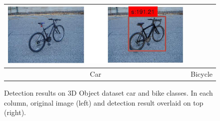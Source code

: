 \documentclass[10pt,twocolumn,letterpaper]{article}
\begin{document}
\begin{figure}[h]
\begin{tabular}{|c|c|}
  \includegraphics[width=0.40\linewidth]{supp/bicycle15.png} \\
  \hline
  Car & Bicycle \\
  \hline
  \end{tabular}
\caption{Detection results on 3D Object dataset car and bike classes. In each column, original image (left) and detection result overlaid on top (right).}%
  \label{fig:3dobject_fig}
\end{figure}

\clearpage
\clearpage
{\small


}
\end{document}
